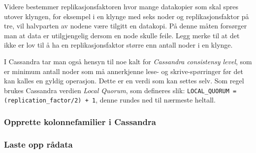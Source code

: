 Videre bestemmer replikasjonsfaktoren hvor mange datakopier som skal spres utover klyngen, for eksempel i en klynge med seks noder og replikasjonsfaktor på tre, vil halvparten av nodene være tilgitt en datakopi. På denne måten forsørger man at data er utilgjengelig dersom en node skulle feile. Legg merke til at det ikke er lov til å ha en replikasjonsfaktor større enn antall noder i en klynge. 

I Cassandra tar man også hensyn til noe kalt for \textit{Cassandra consistensy level}, som er minimum antall noder som må annerkjenne lese- og skrive-spørringer før det kan kalles en gyldig operasjon. Dette er en verdi som kan settes selv. Som regel brukes Cassandra verdien \textit{Local Quorum}, som defineres slik: \lstinline{LOCAL_QUORUM = (replication_factor/2) + 1}, denne rundes ned til nærmeste heltall.

\subsubsection{Opprette kolonnefamilier i Cassandra}

\subsubsection{Laste opp rådata}

